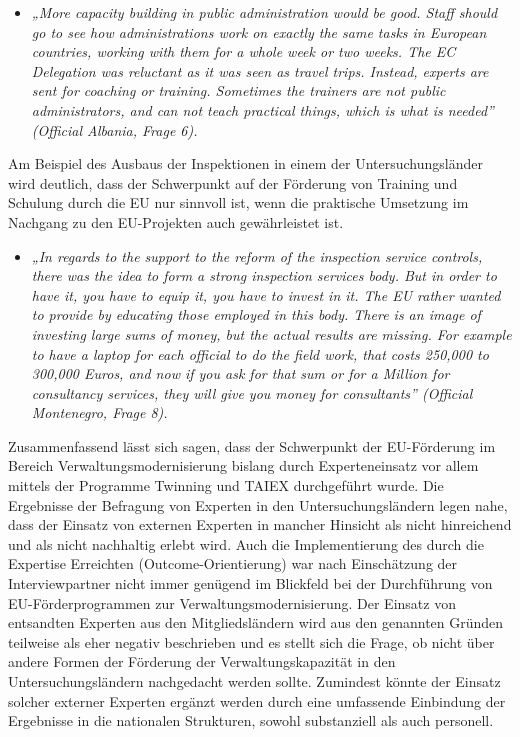 \begin{itemize}[label={}]
\item \textit{„More capacity building in public administration would be good. Staff should go to see how administrations work on exactly the same tasks in European countries, working with them for a whole week or two weeks. The EC Delegation was reluctant as it was seen as travel trips. Instead, experts are sent for coaching or training. Sometimes the trainers are not public administrators, and can not teach practical things, which is what is needed” (Official Albania, Frage 6).}
\end{itemize}
Am Beispiel des Ausbaus der Inspektionen in einem der Untersuchungsländer wird deutlich, dass der Schwerpunkt auf der Förderung von Training und Schulung durch die EU nur sinnvoll ist, wenn die praktische Umsetzung im Nachgang zu den EU-Projekten auch gewährleistet ist.
\begin{itemize}[label={}]
\item \textit{„In regards to the support to the reform of the inspection service controls, there was the idea to form a strong inspection services body. But in order to have it, you have to equip it, you have to invest in it. The EU rather wanted to provide by educating those employed in this body. There is an image of investing large sums of money, but the actual results are missing. For example to have a laptop for each official to do the field work, that costs 250,000 to 300,000 Euros, and now if you ask for that sum or for a Million for consultancy services, they will give you money for consultants” (Official Montenegro, Frage 8).}
\end{itemize}
Zusammenfassend lässt sich sagen, dass der Schwerpunkt der EU-Förderung im Bereich Verwaltungsmodernisierung bislang durch Experteneinsatz vor allem mittels der Programme Twinning und TAIEX durchgeführt wurde. Die Ergebnisse der Befragung von Experten in den Untersuchungsländern legen nahe, dass der Einsatz von externen Experten in mancher Hinsicht als nicht hinreichend und als nicht nachhaltig erlebt wird. Auch die Implementierung des durch die Expertise Erreichten (Outcome-Orientierung) war nach Einschätzung der Interviewpartner nicht immer genügend im Blickfeld bei der Durchführung von EU-Förderprogrammen zur Verwaltungsmodernisierung. Der Einsatz von entsandten Experten aus den Mitgliedsländern wird aus den genannten Gründen teilweise als eher negativ beschrieben und es stellt sich die Frage, ob nicht über andere Formen der Förderung der Verwaltungskapazität in den Untersuchungsländern nachgedacht werden sollte. Zumindest könnte der Einsatz solcher externer Experten ergänzt werden durch eine umfassende Einbindung der Ergebnisse in die nationalen Strukturen, sowohl substanziell als auch personell. \par
